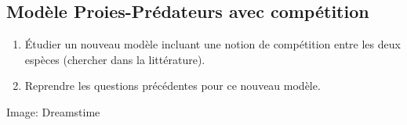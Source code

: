 \documentclass{../ficheTDTP}
\begin{document}
\subsection{Modèle Proies-Prédateurs avec compétition}  
\begin{enumerate}
	\item Étudier un nouveau modèle incluant une notion de compétition entre les deux espèces (chercher dans la littérature).
	\item Reprendre les questions précédentes pour ce nouveau modèle.
\end{enumerate}

\vspace{2cm}
\footnotesize{Image: Dreamstime}
	
\end{document}
